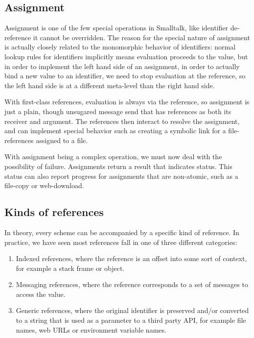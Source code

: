 \documentclass[preprint,authoryear]{llncs}
\begin{document}
\subsection{Assignment}

Assignment is one of the few special operations in Smalltalk, like identifier de-reference it cannot be overridden.
The reason for the special nature of assignment is actually closely related to the monomorphic behavior
of identifiers:  normal lookup rules for identifiers implicitly means evaluation proceeds to the value, but in order to implement the left
hand side of an assignment, in order to actually bind a new value to an identifier, we need to stop evaluation
at the reference, so the left hand side is at a different meta-level than the right hand side\cite{kay-assignment}.

With first-class references, evaluation is always via the reference, so assignment is just a plain, though unsugared
message send that has references as both its receiver and argument.  The references then interact to resolve
the assignment, and can implement special behavior such as creating a symbolic link for a file-references assigned
to a file.

With assignment being a complex operation, we must now deal with the possibility of failure.  Assignments 
return a result that indicates status.  This status can also report progress for assignments that are
non-atomic, such as a file-copy or web-download.



\subsection{Kinds of references}
\label{refkinds}
In theory, every scheme can be accompanied by a specific kind of reference.  In practice, we have 
seen most references fall in one of three different categories:

\begin{enumerate}
\item Indexed references, where the reference is an offset into some sort of context, for
	example a stack frame or object.
\item Messaging references, where the reference corresponds to a set of messages to
	access the value.
\item Generic references, where the original identifier is preserved and/or converted to
	a string that is used as a parameter to a third party API, for example file names,
	web URLs or environment variable names.
\end{enumerate}
\end{document}
